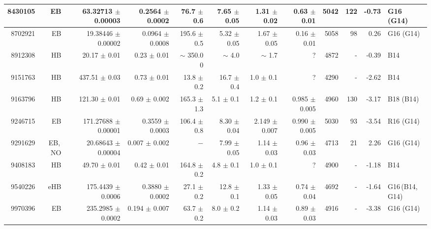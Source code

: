 \begin{landscape}
\begin{longtable}{rrrrrrrrrrrl}
	8430105	&	EB	&	63.32713	$\pm$	0.00003	&	0.2564	$\pm$	0.0002	&	76.7	$\pm$	0.6	&		7.65	$\pm$	0.05	&		1.31	$\pm$	0.02	&	0.63	$\pm$	0.01	&	5042	&	122	&	-0.73	&	G16 (G14)	\\	%
	\hline
	8702921	&	EB	&	19.38446	$\pm$	0.00002	&	0.0964	$\pm$	0.0008	&	195.6	$\pm$	0.5	&		5.32	$\pm$	0.05	&		1.67	$\pm$	0.05	&	0.16	$\pm$	0.01	&	5058	&	98	&	0.26	&	G16 (G14)	\\	%
	8912308	&	HB	&	20.17	$\pm$	0.01	&	0.23	$\pm$	0.01	&	$\sim$	350.0	0	&	$\sim$	4.0			&	$\sim$	1.7			&	?			&	4872	&	-	&	-0.39	&	B14	\\	%
	9151763	&	HB	&	437.51	$\pm$	0.03	&	0.73	$\pm$	0.01	&	13.8	$\pm$	0.2	&		16.7	$\pm$	0.4	&		1.0	$\pm$	0.1	&	?			&	4290	&	-	&	-2.62	&	B14	\\	%
	9163796	&	HB	&	121.30	$\pm$	0.01	&	0.69	$\pm$	0.002	&	165.3	$\pm$	1.3	&		5.1	$\pm$	0.1	&		1.2	$\pm$	0.1	&	0.985	$\pm$	0.005	&	4960	&	130	&	-3.17	&	B18 (B14)	\\	%
	9246715	&	EB	&	171.27688	$\pm$	0.00001	&	0.3559	$\pm$	0.0003	&	106.4	$\pm$	0.8	&		8.30	$\pm$	0.04	&		2.149	$\pm$	0.007	&	0.990	$\pm$	0.005	&	5030	&	93	&	-3.54	&	R16 (G14)	\\	%
	9291629	&	EB,\,NO	&	20.68643	$\pm$	0.00004	&	0.007	$\pm$	0.002	&	$-$			&		7.99	$\pm$	0.05	&		1.14	$\pm$	0.03	&	0.96	$\pm$	0.03	&	4713	&	21	&	2.26	&	G16 (G14)	\\	%
	9408183	&	HB	&	49.70	$\pm$	0.01	&	0.42	$\pm$	0.01	&	164.8	$\pm$	0.2	&		4.8	$\pm$	0.1	&		1.0	$\pm$	0.1	&	?			&	4900	&	-	&	-1.18	&	B14	\\	%
	9540226	&	eHB	&	175.4439	$\pm$	0.0006	&	0.3880	$\pm$	0.0002	&	27.1	$\pm$	0.2	&		12.8	$\pm$	0.1	&		1.33	$\pm$	0.05	&	0.74	$\pm$	0.04	&	4692	&	-	&	-1.64	&	G16\,(B14,\,G14)	\\	%
	9970396	&	EB	&	235.2985	$\pm$	0.0002	&	0.194	$\pm$	0.007	&	63.7	$\pm$	0.2	&		8.0	$\pm$	0.2	&		1.14	$\pm$	0.03	&	0.89	$\pm$	0.03	&	4916	&	-	&	-3.38	&	G16 (G14)	\\	%

\end{longtable}
\end{landscape}

